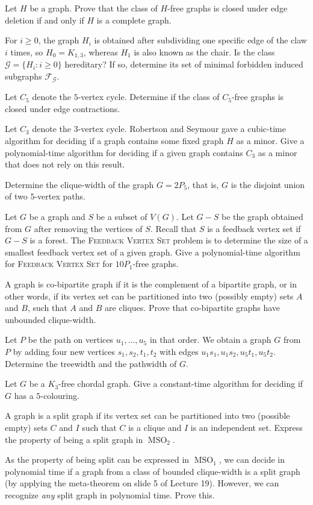 \question Let $H$ be a graph. Prove that the class of $H$-free graphs is closed under edge deletion if and only if $H$ is a complete graph.

\question For $i \geq 0$, the graph $H_i$ is obtained after subdividing one specific edge of the claw $i$ times, so $H_0 = K_{1,3}$, whereas $H_1$ is also known as the chair. Is the class $\mathcal G = \{H_i: i \geq 0\}$ hereditary? If so, determine its set of minimal forbidden induced subgraphs $\mathcal F_{\mathcal G}$.

\question Let $C_5$ denote the $5$-vertex cycle. Determine if the class of $C_5$-free graphs is closed under edge contractions.

\question Let $C_3$ denote the $3$-vertex cycle. Robertson and Seymour gave a cubic-time algorithm for deciding if a graph contains some fixed graph $H$ as a minor. Give a polynomial-time algorithm for deciding if a given graph contains $C_3$ as a minor that does not rely on this result.

\question Determine the clique-width of the graph $G = 2P_5$, that is, $G$ is the disjoint union of two $5$-vertex paths.

\question Let $G$ be a graph and $S$ be a subset of $V(G)$. Let $G - S$ be the graph obtained from $G$ after removing the vertices of $S$. Recall that $S$ is a feedback vertex set if $G - S$ is a forest. The \textsc{Feedback Vertex Set} problem is to determine the size of a smallest feedback vertex set of a given graph. Give a polynomial-time algorithm for \textsc{Feedback Vertex Set} for $10P_1$-free graphs.

\question A graph is co-bipartite graph if it is the complement of a bipartite graph, or in other words, if its vertex set can be partitioned into two (possibly empty) sets $A$ and $B$, such that $A$ and $B$ are cliques. Prove that co-bipartite graphs have unbounded clique-width.

\question Let $P$ be the path on vertices $u_1, \ldots, u_5$ in that order. We obtain a graph $G$ from $P$ by adding four new vertices $s_1, s_2, t_1, t_2$ with edges $u_1s_1, u_1s_2, u_5t_1, u_5t_2$. Determine the treewidth and the pathwidth of $G$. 

\question Let $G$ be a $K_3$-free chordal graph. Give a constant-time algorithm for deciding if $G$ has a $5$-colouring.

\question A graph is a split graph if its vertex set can be partitioned into two (possible empty) sets $C$ and $I$ such that $C$ is a clique and $I$ is an independent set. Express the property of being a split graph in $\operatorname{MSO}_2$.

\question As the property of being split can be expressed in $\operatorname{MSO}_1$, we can decide in polynomial time if a graph from a class of bounded clique-width is a split graph (by applying the meta-theorem on slide 5 of Lecture 19). However, we can recognize \emph{any} split graph in polynomial time. Prove this. 